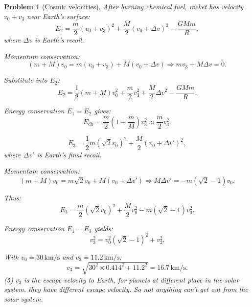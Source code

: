 \documentclass{article}
\theoremstyle{1}
\newtheorem{problem}{Problem}
\begin{document}
\begin{problem}[Cosmic velocities]
After burning chemical fuel, rocket has velocity \( v_0 + v_3 \) near Earth's surface:
\[
E_2 = \frac{m}{2}(v_0 + v_3)^2 + \frac{M}{2}(v_0 + \Delta v)^2 - \frac{GMm}{R},
\]
where \( \Delta v \) is Earth's recoil.

Momentum conservation:
\[
(m + M)v_0 = m(v_0 + v_3) + M(v_0 + \Delta v) \Rightarrow mv_3 + M\Delta v = 0.
\]

Substitute into \( E_2 \):
\[
E_2 = \frac{1}{2}(m + M)v_0^2 + \frac{m}{2}v_3^2 + \frac{M}{2}\Delta v^2 - \frac{GMm}{R}.
\]

Energy conservation \( E_1 = E_2 \) gives:
\[
E_{\text{ch}} = \frac{m}{2}\left(1 + \frac{m}{M}\right)v_3^2 \approx \frac{m}{2}v_3^2.
\]


\[
E_3 = \frac{1}{2}m(\sqrt{2}v_0)^2 + \frac{M}{2}(v_0 + \Delta v')^2,
\]
where \( \Delta v' \) is Earth's final recoil.

Momentum conservation:
\[
(m + M)v_0 = m\sqrt{2}v_0 + M(v_0 + \Delta v') \Rightarrow M\Delta v' = -m(\sqrt{2} - 1)v_0.
\]

Thus:
\[
E_3 = \frac{m}{2}(\sqrt{2}v_0)^2 + \frac{M}{2}v_0^2 - m(\sqrt{2} - 1)v_0^2.
\]

Energy conservation \( E_1 = E_3 \) yields:
\[
v_3^2 = v_0^2(\sqrt{2} - 1)^2 + v_2^2.
\]

With \( v_0 = 30 \, \text{km/s} \) and \( v_2 = 11.2 \, \text{km/s} \):
\[
v_3 = \sqrt{30^2 \times 0.414^2 + 11.2^2} = 16.7 \, \text{km/s}.
\]
(5) $v_3$ is the escape velocity to Earth, for planets at different place in the solar system, they have different escape velocity. So not anything can't get out from the solar system.
\end{problem}
\end{document}
